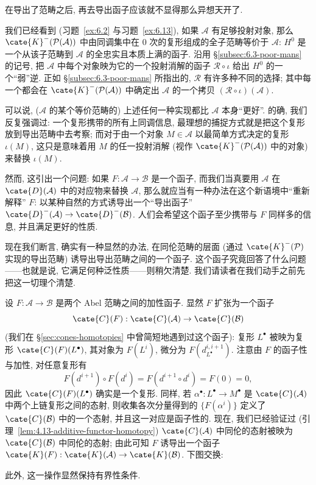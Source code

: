 在导出了范畴之后, 再去导出函子应该就不显得那么异想天开了.

我们已经看到 (习题~\ref{ex:6.2} 与习题~\ref{ex:6.13}), 如果 $\mathcal{A}$ 有足够投射对象, 那么 $\cate{K}^-(\mathcal{P}(\mathcal{A}))$ 中由同调集中在 $0$ 次的复形组成的全子范畴等价于 $\mathcal{A}$: $H^0$ 是一个从该子范畴到 $\mathcal{A}$ 的全忠实且本质上满的函子. 沿用 \S\ref{subsec:6.3-poor-mans} 的记号, 把 $\mathcal{A}$ 中每个对象映为它的一个投射消解的函子 $\mathcal{R}\circ\iota$ 给出 $H^0$ 的一个``弱''逆. 正如 \S\ref{subsec:6.3-poor-mans} 所指出的, $\mathcal{R}$ 有许多种不同的选择; 其中每一个都会在 $\cate{K}^-(\mathcal{P}(\mathcal{A}))$ 中确定出 $\mathcal{A}$ 的一个拷贝 $(\mathcal{R}\circ\iota)(\mathcal{A})$.

可以说, ($\mathcal{A}$ 的某个等价范畴的) 上述任何一种实现都比 $\mathcal{A}$ 本身``更好''. 的确, 我们反复强调过: 一个复形携带的所有上同调信息, 最理想的捕捉方式就是把这个复形放到导出范畴中去考察; 而对于由一个对象 $M\in\mathcal{A}$ 以最简单方式决定的复形 $\iota(M)$, 这只是意味着用 $M$ 的任一投射消解 (视作 $\cate{K}^-(\mathcal{P}(\mathcal{A}))$ 中的对象) 来替换 $\iota(M)$.

然而, 这引出一个问题: 如果 $F:\mathcal{A}\to\mathcal{B}$ 是一个函子, 而我们当真要用 $\mathcal{A}$ 在 $\cate{D}(\mathcal{A})$ 中的对应物来替换 $\mathcal{A}$, 那么就应当有一种办法在这个新语境中``重新解释'' $F$: 以某种自然的方式诱导出一个``导出函子'' $\cate{D}^-(\mathcal{A})\to\cate{D}^-(\mathcal{B})$. 人们会希望这个函子至少携带与 $F$ 同样多的信息, 并且满足更好的性质.

现在我们断言, 确实有一种显然的办法, 在同伦范畴的层面 (通过 $\cate{K}^-(\mathcal{P})$ 实现的导出范畴) 诱导出导出范畴之间的一个函子. 这个函子究竟回答了什么问题——也就是说, 它满足何种泛性质——则稍欠清楚. 我们请读者在我们动手之前先把这一切理个清楚.

设 $F:\mathcal{A}\to\mathcal{B}$ 是两个 Abel 范畴之间的加性函子. 显然 $F$ 扩张为一个函子
\[
\cate{C}(F):\cate{C}(\mathcal{A})\to\cate{C}(\mathcal{B})
\]
(我们在 \S\ref{sec:cones-homotopies} 中曾简短地遇到过这个函子): 复形 $L^\bullet$ 被映为复形 $\cate{C}(F)(L^\bullet)$, 其对象为 $F(L^i)$, 微分为 $F(d_{L^\bullet}^{i,i+1})$. 注意由 $F$ 的函子性与加性, 对任意复形有
\[
F(d^{i+1})\circ F(d^i)=F(d^{i+1}\circ d^i)=F(0)=0,
\]
因此 $\cate{C}(F)(L^\bullet)$ 确实是一个复形. 同样, 若 $\alpha^\bullet:L^\bullet\to M^\bullet$ 是 $\cate{C}(\mathcal{A})$ 中两个上链复形之间的态射, 则收集各次分量得到的 $\{F(\alpha^i)\}$ 定义了 $\cate{C}(\mathcal{B})$ 中的一个态射, 并且这一对应是函子性的. 现在, 我们已经验证过 (引理~\ref{lem:4.13-additive-functor-homotopy}) $\cate{C}(\mathcal{A})$ 中同伦的态射被映为 $\cate{C}(\mathcal{B})$ 中同伦的态射; 由此可知 $F$ 诱导出一个函子 $\cate{K}(F):\cate{K}(\mathcal{A})\to\cate{K}(\mathcal{B})$. 下图交换:
\begin{center}
\end{center}
此外, 这一操作显然保持有界性条件.

